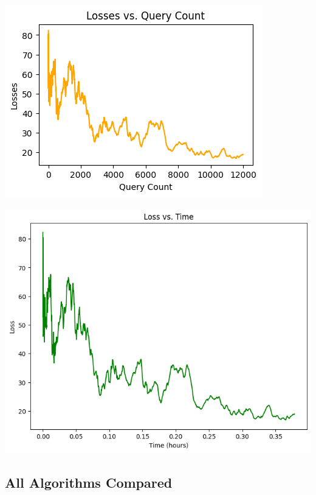 \documentclass[10pt,twocolumn,letterpaper]{article}
\begin{document}
\begin{center}
   \includegraphics*[scale=0.7]{img/RDSA_loss_vs_querycount.png}
\end{center}

\begin{center}
   \includegraphics*[scale=0.40]{img/RDSA_loss_vs_time.png}
\end{center}

\subsection{All Algorithms Compared}
\end{document}
